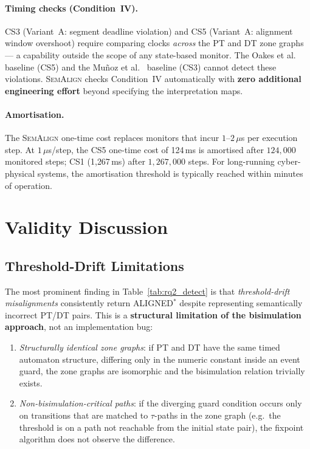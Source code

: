 \documentclass[10pt,a4paper]{article}
\newcommand{\WARN}[1]{\textcolor{warnred}{#1}}
\newcommand{\tool}{\textsc{SemAlign}}
\begin{document}
\paragraph{Timing checks (Condition~IV).}
CS3 (Variant~A: segment deadline violation) and CS5 (Variant~A: alignment
window overshoot) require comparing clocks \emph{across} the PT and DT zone
graphs — a capability outside the scope of any state-based monitor.
The Oakes et al.~\cite{Oakes2024} baseline (CS5) and the
Mu\~noz et al.~\cite{Munoz2024} baseline (CS3) cannot detect these violations.
\tool{} checks Condition~IV automatically with \textbf{zero additional
engineering effort} beyond specifying the interpretation maps.

\paragraph{Amortisation.}
The \tool{} one-time cost replaces monitors that incur $1$--$2\,\mu$s per
execution step. At $1\,\mu$s/step, the CS5 one-time cost of 124\,ms is
amortised after $124{,}000$ monitored steps; CS1 (1{,}267\,ms) after
$1{,}267{,}000$ steps. For long-running cyber-physical systems, the
amortisation threshold is typically reached within minutes of operation.

\section{Validity Discussion}
\label{sec:validity}

\subsection{Threshold-Drift Limitations}

The most prominent finding in Table~\ref{tab:rq2_detect} is that
\emph{threshold-drift misalignments} consistently return \WARN{ALIGNED${}^*$}
despite representing semantically incorrect PT/DT pairs. This is a
\textbf{structural limitation of the bisimulation approach}, not an
implementation bug:

\begin{enumerate}
  \item \emph{Structurally identical zone graphs}: if PT and DT have the same
        timed automaton structure, differing only in the numeric constant inside
        an event guard, the zone graphs are isomorphic and the bisimulation
        relation trivially exists.
  \item \emph{Non-bisimulation-critical paths}: if the diverging guard
        condition occurs only on transitions that are matched to $\tau$-paths
        in the zone graph (e.g.\ the threshold is on a path not reachable from
        the initial state pair), the fixpoint algorithm does not observe
        the difference.
\end{enumerate}
\end{document}
